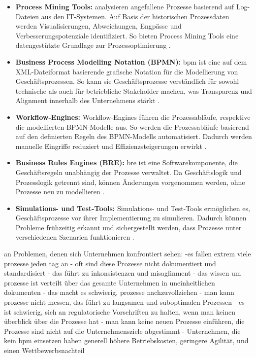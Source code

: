     \begin{itemize} 
        
        \item \textbf{Process Mining Tools: } analysieren angefallene Prozesse basierend auf Log-Dateien aus den IT-Systemen. Auf Basis der historischen Prozessdaten werden Visualisierungen, Abweichungen, Engpässe und Verbesserungspotenziale identifiziert. So bieten Process Mining Tools eine datengestützte Grundlage zur Prozessoptimierung \citep{vanderAalst2016}.

        \item \textbf{Business Process Modelling Notation (BPMN): } \gls{bpm} ist eine auf dem XML-Dateiformat basierende grafische Notation für die Modellierung von Geschäftsprozessen. So kann sie Geschäftsprozesse verständlich für sowohl technische als auch für betriebliche Stakeholder machen, was Transparenz und Alignment innerhalb des Unternehmens stärkt \citep{bpmn2024}.
        
        \item \textbf{Workflow-Engines: } Workflow-Engines führen die Prozessabläufe, respektive die modellierten BPMN-Modelle aus. So werden die Prozessabläufe basierend auf den definierten Regeln des BPMN-Modells automatisiert. Dadurch werden manuelle Eingriffe reduziert und Effizienzsteigerungen erwirkt \citep{camunda2024}.
        
        \item \textbf{Business Rules Engines (BRE): } \gls{bre} ist eine Softwarekomponente, die Geschäftsregeln unabhängig der Prozesse verwaltet. Da Geschäftslogik und Prozesslogik getrennt sind, können Änderungen vorgenommen werden, ohne Prozesse neu zu modellieren \citep{swoox2024}.
        
        \item \textbf{Simulations- und Test-Tools: } Simulations- und Test-Tools ermöglichen es, Geschäftsprozesse vor ihrer Implementierung zu simulieren. Dadurch können Probleme frühzeitig erkannt und sichergestellt werden, dass Prozesse unter verschiedenen Szenarien funktionieren \citep{visualparadigm2024}.
        
        \end{itemize}
    an Problemen, denen sich Unternehmen konfrontiert sehen: 
    -es fallen extrem viele prozesse jeden tag an
    - oft sind diese Prozesse nicht dokumentiert und standardisiert
    - das führt zu inkonsistenzen und misaglinment
    - das wissen um prozesse ist verteilt über das gesamte Unternehmen in uneinheitlichen dokumenten
    - das macht es schwierig, prozesse nachzuvollziehen
    - man kann prozesse nicht messen, das führt zu langsamen und suboptimalen Prozessen
    - es ist schwierig, sich an regulatorische Vorschriften zu halten, wenn man keinen überblick über die Prozesse hat
    - man kann keine neuen Prozesse einführen, die Prozesse sind nicht auf die Unternehmensziele abgestimmt
    - Unternehmen, die kein bpm einsetzen haben generell höhere Betriebskosten, geringere Agilität, und einen Wettbewerbsnachteil

